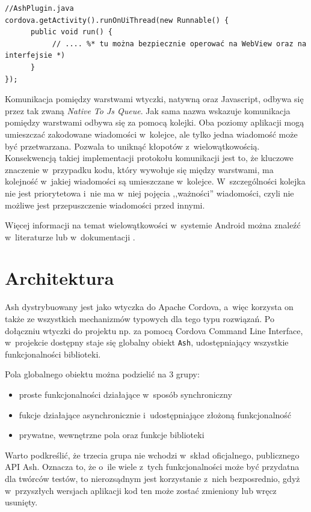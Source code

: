 \documentclass[brudnopis]{xmgr}
\begin{document}
\begin{lstlisting}
//AshPlugin.java
cordova.getActivity().runOnUiThread(new Runnable() {
      public void run() {
           // .... %* tu można bezpiecznie operować na WebView oraz na interfejsie *)
      }
});
\end{lstlisting}

Komunikacja pomiędzy warstwami wtyczki, natywną oraz Javascript, odbywa się przez tak zwaną \textit{Native To Js Queue}. Jak sama nazwa wskazuje komunikacja pomiędzy warstwami odbywa się za pomocą kolejki. Oba poziomy aplikacji mogą umieszczać zakodowane wiadomości w~kolejce, ale tylko jedna wiadomość może być przetwarzana. Pozwala to uniknąć kłopotów z~wielowątkowością. Konsekwencją takiej implementacji protokołu komunikacji jest to, że kluczowe znaczenie w~przypadku kodu, który wywołuje się między warstwami,  ma kolejność w~jakiej wiadomości są umieszczane w~kolejce. W~szczególności kolejka nie jest priorytetowa i~nie ma w~niej pojęcia ,,ważności'' wiadomości, czyli nie możliwe jest przepuszczenie wiadomości przed innymi.

Więcej informacji na temat wielowątkowości w~systemie Android można znaleźć w~literaturze \cite{AndroidInPractice} lub w~dokumentacji \cite{AndroidDoc}. 

\chapter{Architektura}

Ash dystrybuowany jest jako wtyczka do Apache Cordova, a~więc korzysta on także ze wszystkich mechanizmów typowych dla tego typu rozwiązań. Po dołączniu wtyczki do projektu np. za pomocą Cordova Command Line Interface, w~projekcie dostępny staje się globalny obiekt \texttt{Ash}, udostępniający wszystkie funkcjonalności biblioteki. 

Pola globalnego obiektu można podzielić na 3 grupy:  
\begin{itemize}
  \item proste funkcjonalności działające w~sposób synchroniczny
  \item fukcje działające asynchronicznie i~udostępniające złożoną funkcjonalność 
  \item prywatne, wewnętrzne pola oraz funkcje biblioteki
\end{itemize}
Warto podkreślić, że trzecia grupa nie wchodzi w~skład oficjalnego, publicznego API Ash. Oznacza to, że o~ile wiele z~tych funkcjonalności może być przydatna dla twórców testów, to nierozsądnym jest korzystanie z~nich bezposrednio, gdyż w~przyszłych wersjach aplikacji kod ten może zostać zmieniony lub wręcz usunięty.
\end{document}
